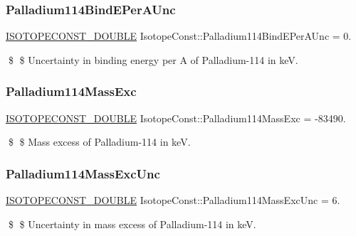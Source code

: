 \subsubsection{\texorpdfstring{Palladium114\+Bind\+E\+Per\+A\+Unc}{Palladium114BindEPerAUnc}}
{\footnotesize\ttfamily \mbox{\hyperlink{group___isotope_const-_macros_ga8f45a7272ce02c0b4c65c44636ed719a}{I\+S\+O\+T\+O\+P\+E\+C\+O\+N\+S\+T\+\_\+\+D\+O\+U\+B\+LE}} Isotope\+Const\+::\+Palladium114\+Bind\+E\+Per\+A\+Unc = 0.}

\$ \$ Uncertainty in binding energy per A of Palladium-\/114 in keV. \mbox{\label{group___isotope_const-_palladium-_pd114_ga6ade9f5f05a2524d764afbdb820a155b}} 
\subsubsection{\texorpdfstring{Palladium114\+Mass\+Exc}{Palladium114MassExc}}
{\footnotesize\ttfamily \mbox{\hyperlink{group___isotope_const-_macros_ga8f45a7272ce02c0b4c65c44636ed719a}{I\+S\+O\+T\+O\+P\+E\+C\+O\+N\+S\+T\+\_\+\+D\+O\+U\+B\+LE}} Isotope\+Const\+::\+Palladium114\+Mass\+Exc = -\/83490.}

\$ \$ Mass excess of Palladium-\/114 in keV. \mbox{\label{group___isotope_const-_palladium-_pd114_ga8cd0c5f7dfa7225b3e784614b3f843f4}} 
\subsubsection{\texorpdfstring{Palladium114\+Mass\+Exc\+Unc}{Palladium114MassExcUnc}}
{\footnotesize\ttfamily \mbox{\hyperlink{group___isotope_const-_macros_ga8f45a7272ce02c0b4c65c44636ed719a}{I\+S\+O\+T\+O\+P\+E\+C\+O\+N\+S\+T\+\_\+\+D\+O\+U\+B\+LE}} Isotope\+Const\+::\+Palladium114\+Mass\+Exc\+Unc = 6.}

\$ \$ Uncertainty in mass excess of Palladium-\/114 in keV. \mbox{\label{group___isotope_const-_palladium-_pd114_gacd0ad19ac27cf9193d807eb748445ed2}} 
